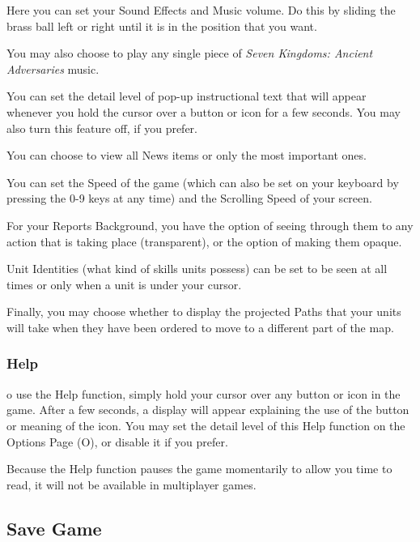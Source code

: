 Here you can set your Sound Effects and Music volume. Do this by sliding the brass ball left or right until it is in the position that you want.

You may also choose to play any single piece of \textit{Seven Kingdoms: Ancient Adversaries} music.


You can set the detail level of pop-up instructional text that will appear whenever you hold the cursor over a button or icon for a few seconds. You may also turn this feature off, if you prefer.

You can choose to view all News items or only the most important ones.


You can set the Speed of the game (which can also be set on your keyboard by pressing the 0-9 keys at any time) and the Scrolling Speed of your screen.

For your Reports Background, you have the option of seeing through them to any action that is taking place (transparent), or the option of making them opaque.

Unit Identities (what kind of skills units possess) can be set to be seen at all times or only when a unit is under your cursor.

Finally, you may choose whether to display the projected Paths that your units will take when they have been ordered to move to a different part of the map.

\subsubsection{Help}



o use the Help function, simply hold your cursor over any button or icon in the game. After a few seconds, a display will appear explaining the use of the button or meaning of the icon. You may set the detail level of this Help function on the Options Page (O), or disable it if you prefer.

Because the Help function pauses the game momentarily to allow you time to read, it will not be available in multiplayer games.

\subsection{Save Game}

